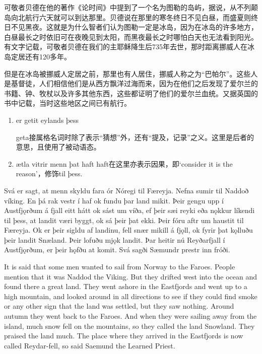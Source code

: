 \begin{translation*}{}
    可敬者贝德在他的著作《论时间》中提到了一个名为图勒的岛屿，据说，从不列颠岛向北航行六天就可以到达那里。贝德说在那里的寒冬终日不见白昼，而盛夏则终日不见黑夜。这就是为什么智者们认为图勒一定是冰岛，因为在冰岛的许多地方，白昼最长之时依旧可在夜晚见到太阳，而黑夜最长之时哪怕白天也无法看到阳光。有文字记载，可敬者贝德在我们的主耶稣降生后735年去世，那时距离挪威人在冰岛定居还有120多年。

    但是在冰岛被挪威人定居之前，那里也有人居住，挪威人称之为“巴帕尔”。这些人是基督徒，人们相信他们是从西方飘洋过海而来，因为在他们之后发现了爱尔兰的书籍、钟、牧杖以及许多其他东西，这些都证明了他们的爱尔兰血统。又据英国的书中记载，当时这些地区之间已有航行。
\end{translation*}
\begin{grammar*}{}
    \begin{enumerate}[leftmargin=*]
        \item er getit eylands þess

              geta接属格名词时除了表示“猜想”外，还有“提及，记录”之义。这里是后者的意思，且使用了被动语态。
        \item ætla vitrir menn þat haft
              haft在这里亦表示因果，即`consider it is the reason'，修饰til þess.
    \end{enumerate}
\end{grammar*}
\begin{paracol}{2}
    Svá er sagt, at menn skyldu fara ór Nóregi til Færeyja. Nefna sumir til Naddoð víking. En þá rak vestr í haf ok fundu þar land mikit. Þeir gengu upp í Austfjǫrðum á fjall eitt hátt ok sást um víða, ef þeir sæi reyki eða nǫkkur líkendi til þess, at landit væri byggt, ok sá þeir þat ekki. Þeir fóru aftr um haustit til Færeyja. Ok er þeir sigldu af landinu, fell snær mikill á fjǫll, ok fyrir þat kǫlluðu þeir landit Snæland. Þeir lofuðu mjǫk landit. Þar heitir nú Reyðarfjall í Austfjǫrðum, er þeir hǫfðu at komit. Svá sagði Sæmundr prestr inn fróði.
    \switchcolumn

    It is said that some men wanted to sail from Norway to the Faroes. People mention that it was Naddod the Viking. But they drifted west into the ocean and found there a great land. They went ashore in the Eastfjords and went up to a high mountain, and looked around in all directions to see if they could find smoke or any other sign that the land was settled, but they saw nothing. Around autumn they went back to the Faroes. And when they were sailing away from the island, much snow fell on the mountains, so they called the land Snowland. They praised the land much. The place where they arrived in the Eastfjords is now called Reydar-fell, so said Saemund the Learned Priest.
\end{paracol}
